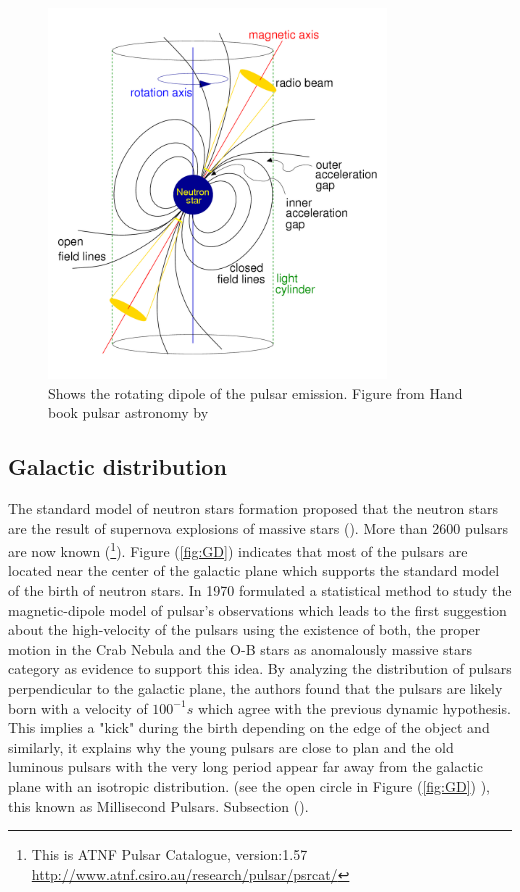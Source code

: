 \begin{figure}[H] 
\centering    
\includegraphics[width=0.8\textwidth]{PSRs_pulsar_sketch.png}
\caption[magnetosphere model]{Shows the rotating dipole of the pulsar emission.
Figure from Hand book pulsar astronomy by \citet{lorimer2005handbook} }
\label{fig:dipole model}
\end{figure}


\subsection{Galactic distribution}
\label{GD}
The standard model of neutron stars formation proposed that the neutron stars are the result of supernova explosions of massive stars (\citet{lyne1994high}). More than 2600 pulsars are now known (\footnote{This is ATNF Pulsar Catalogue, version:1.57 \url{http://www.atnf.csiro.au/research/pulsar/psrcat/}}). Figure (\ref{fig:GD}) indicates that most of the pulsars are located near the center of the galactic plane which supports the standard model of the birth of neutron stars. In 1970 \citet{gunn1970nature} formulated a statistical method to study the magnetic-dipole model of pulsar's observations which leads to the first suggestion about the high-velocity of the pulsars using the existence of both, the proper motion in the Crab Nebula and the O-B stars as anomalously massive stars category as evidence to support this idea. By analyzing the distribution of pulsars perpendicular to the galactic plane, the authors found that the pulsars are likely born with a velocity of $100^{-1}s$ which agree with the previous dynamic hypothesis. This implies a "kick" during the birth depending on the edge of the object and similarly, it explains why the young pulsars are close to plan and the old luminous pulsars with the very long period appear far away from the galactic plane with an isotropic distribution. (see the open circle in Figure (\ref{fig:GD}) ), this known as Millisecond Pulsars. Subsection (). 

